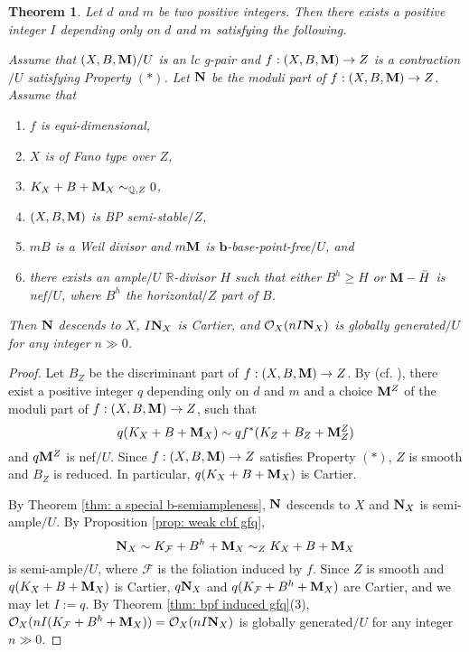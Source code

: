 \documentclass[11pt]{amsart}
\numberwithin{equation}{section}
\newcommand{\bb}{\bm{b}}
\newcommand{\Mm}{{\bf{M}}}
\newcommand{\Nn}{{\bf{N}}}
\newcommand{\Rr}{\mathbb{R}}
\newcommand{\Ff}{\mathcal{F}}
\newtheorem{thm}{Theorem}[subsection]
\theoremstyle{definition}
\theoremstyle{definition}
\theoremstyle{definition}
\begin{document}
\begin{thm}\label{thm: a special effective b-semiampleness}
Let $d$ and $m$ be two positive integers. Then there exists a positive integer $I$ depending only on $d$ and $m$ satisfying the following.

Assume that $(X,B,\Mm)/U$ is an lc g-pair and $f: (X,B,\Mm)\rightarrow Z$ is a contraction$/U$ satisfying Property $(*)$. Let $\Nn$ be the moduli part of $f: (X,B,\Mm)\rightarrow Z$. Assume that
 \begin{enumerate}
        \item $f$ is equi-dimensional,
        \item $X$ is of Fano type over $Z$,
        \item $K_X+B+\Mm_X\sim_{\mathbb Q,Z}0$,
        \item $(X,B,\Mm)$ is BP semi-stable$/Z$,
        \item $mB$ is a Weil divisor and $m\Mm$ is $\bb$-base-point-free$/U$, and
        \item there exists an ample$/U$ $\Rr$-divisor $H$ such that either $B^h\geq H$ or $\Mm-\bar H$ is nef$/U$, where $B^h$ the horizontal$/Z$ part of $B$.
    \end{enumerate}
Then $\Nn$ descends to $X$, $I\Nn_X$ is Cartier, and $\mathcal{O}_X(nI\Nn_X)$ is globally generated$/U$ for any integer $n\gg 0$.
\end{thm}
\begin{proof}
Let $B_Z$ be the discriminant part of $f: (X,B,\Mm)\rightarrow Z$. By \cite[Lemma 4.2]{Has22} (cf. \cite[Proposition 6.3]{Bir19}), there exist a positive integer $q$ depending only on $d$ and $m$ and a choice $\Mm^Z$  of the moduli part of $f: (X,B,\Mm)\rightarrow Z$, such that 
$$q(K_X+B+\Mm_X)\sim qf^*(K_Z+B_Z+\Mm^Z_Z)$$ 
and $q\Mm^Z$ is nef$/U$. Since $f: (X,B,\Mm)\rightarrow Z$ satisfies Property $(*)$, $Z$ is smooth and $B_Z$ is reduced. In particular, $q(K_X+B+\Mm_X)$ is Cartier.

By Theorem \ref{thm: a special b-semiampleness}, $\Nn$ descends to $X$ and $\Nn_X$ is semi-ample$/U$. By Proposition \ref{prop: weak cbf gfq}, 
$$\Nn_X\sim K_{\Ff}+B^h+\Mm_X\sim_ZK_X+B+\Mm_X$$ 
is semi-ample$/U$, where $\Ff$ is the foliation induced by $f$. Since $Z$ is smooth and $q(K_X+B+\Mm_X)$ is Cartier, $q\Nn_X$ and $q(K_{\Ff}+B^h+\Mm_X)$ are Cartier, and we may let $I:=q$. By Theorem \ref{thm: bpf induced gfq}(3), $\mathcal{O}_X(nI(K_{\Ff}+B^h+\Mm_X))=\mathcal{O}_X(nI\Nn_X)$ is globally generated$/U$ for any integer $n\gg 0$.
\end{proof}
\end{document}
